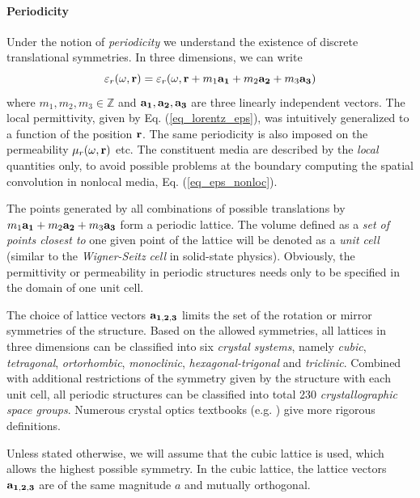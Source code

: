 \paragraph{Periodicity}%
Under the notion of \textit{periodicity} we understand the existence of discrete translational symmetries. In three dimensions, we can write
\begin{equation} \varepsilon_r(\omega, {\mathbf{r}}) = \varepsilon_r(\omega, {\mathbf{r}} + m_1 {\mathbf{a_1}} + m_2 {\mathbf{a_2}} + m_3 {\mathbf{a_3}}) \label{eq_trsym}\end{equation}
where $m_1, m_2, m_3 \in \mathbb{Z}$ and ${\mathbf{a_1}}, {\mathbf{a_2}}, {\mathbf{a_3}}$ are three linearly independent vectors. The local permittivity, given by Eq. (\ref{eq_lorentz_eps}), was intuitively generalized to a function of the position ${\mathbf{r}}$. The same periodicity is also imposed on the permeability $\mu_r(\omega,{\mathbf{r}})$ etc. The constituent media are described by the \textit{local} quantities only, to avoid possible problems at the boundary computing the spatial convolution  in nonlocal media, Eq. (\ref{eq_eps_nonloc}). 

The points generated by all combinations of possible translations by $m_1 {\mathbf{a_1}} + m_2 {\mathbf{a_2}} + m_3 {\mathbf{a_3}}$ form a periodic lattice.
The volume defined as a \textit{set of points closest to} one given point of the lattice will be denoted as a \textit{unit cell} (similar to the \textit{Wigner-Seitz cell} in solid-state physics). Obviously, the permittivity or permeability in periodic structures needs only to be specified in the domain of one unit cell.

The choice of lattice vectors ${\mathbf{a_{1,2,3}}}$ limits the set of the rotation or mirror symmetries of the structure. Based on the allowed symmetries, all lattices in three dimensions can be classified into six \textit{crystal systems}, namely \textit{cubic}, \textit{tetragonal}, \textit{ortorhombic}, \textit{monoclinic}, \textit{hexagonal-trigonal} and \textit{triclinic}. Combined with additional restrictions of the symmetry given by the structure with each unit cell, all periodic structures can be classified into total 230 \textit{crystallographic space groups}. Numerous crystal optics textbooks (e.g. \cite[p. 678]{born1999book}) give more rigorous definitions. 

Unless stated otherwise, we will assume that the cubic lattice is used, which allows the highest possible symmetry. In the cubic lattice, the lattice vectors ${\mathbf{a_{1,2,3}}}$ are of the same magnitude $a$ and mutually orthogonal. %

